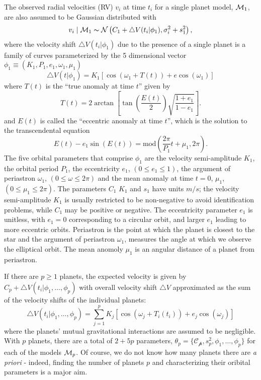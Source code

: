 The observed radial velocities (RV) $v_i$ at time $t_i$
for a single planet model, ${\cal{M}}_1$, are also assumed to be Gaussian
distributed  with
\begin{equation}\label{Velocity_Model}
v_i \mid \M_1 \ind \mathcal{N}\left(C_1 +\bigtriangleup
V(t_i|\phi_1),\sigma_i^2+s_1^2\right),
\end{equation}
where the velocity shift $\bigtriangleup
V(t_i|\phi_1)$ due to the presence of a single planet is
a  family of curves parameterized by the 5 dimensional vector
$\phi_1 \equiv (K_1,P_1,e_1,\omega_1,\mu_1)$
\begin{equation}\label{Velocity_1p_Model}
\bigtriangleup V(t|\phi_1)=K_1[\cos(\omega_1+T(t))+e\cos(\omega_1)]
\end{equation}
where $T(t)$ is the ``true anomaly at time $t$'' given by
\begin{equation}\label{true_anomaly}
T(t)=2\arctan\left[\tan(\frac{E(t)}{2})\sqrt{\frac{1+e_1}{1-e_1}}\right].
\end{equation}
and $E(t)$ is called the ``eccentric anomaly at time $t$'', which is the
solution to the transcendental equation
\begin{equation}\label{transcendental_equation}
E(t)-e_1\sin(E(t))=\mbox{mod}\left(\frac{2\pi}{P_1}t+\mu_1,2\pi\right).
\end{equation}
The five orbital parameters that comprise $\phi_1$ are the velocity
semi-amplitude $K_1$, the orbital period $P_1$, the eccentricity $e_1$,
$(0\leq e_1 \le 1)$, the argument of periastron $\omega_1$, $(0\le \omega
\le 2\pi)$ and the mean anomaly at time $t=0$, $\mu_1$, $(0\le \mu_1
\le 2\pi)$.  The parameters $C_1$ $K_1$ and $s_1$ have units $m/s$;
the velocity semi-amplitude $K_1$ is usually restricted to be
non-negative to avoid identification problems, while $C_1$ may be
positive or negative.  The eccentricity parameter $e_1$ is unitless,
with $e_1 = 0$ corresponding to a circular orbit, and larger $e_1$ leading
to more eccentric orbits. Periastron is the point at which the planet
is closest to the star and the argument of periastron $\omega_1$, measures
the angle at which we observe the elliptical orbit.  The mean anomoly $\mu_1$ is
an angular distance of a planet from periastron. 

If there are $p\ge 1$ planets, the expected velocity is given by $C_p
+ \bigtriangleup V(t_i|\phi_1,\ldots,\phi_p)$ with overall velocity shift
$\bigtriangleup V$  approximated as the sum of the velocity
shifts of the individual planets:
\begin{equation}\label{Velocity_2p_Model}
\bigtriangleup V(t_i|\phi_1,\ldots,\phi_p)=\sum_{j=1}^p
K_j[\cos(\omega_j+T_i(t_i))+e_j\cos(\omega_j)]
\end{equation}
where the planets' mutual gravitational interactions are assumed to be
negligible.  With $p$ planets, there are a total of $2+5p$ parameters,
$\theta_p = \{ \mathcal{C_p},s_p^2,\phi_1,\ldots,\phi_p\}$ for each of the
models ${\cal{M}}_p$. Of course, we do not know how many planets there are
\emph{a priori} - indeed, finding the number of planets $p$ and
characterizing their oribital parameters is a major aim. 

